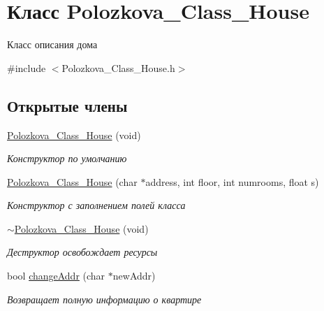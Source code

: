 \hypertarget{class_polozkova___class___house}{\section{Класс Polozkova\+\_\+\+Class\+\_\+\+House}
\label{class_polozkova___class___house}
}


Класс описания дома  




{\ttfamily \#include $<$Polozkova\+\_\+\+Class\+\_\+\+House.\+h$>$}

\subsection*{Открытые члены}
\begin{DoxyCompactItemize}
\item 
\hyperlink{class_polozkova___class___house_a50fe5562cd6f2821eec25293f736ab40}{Polozkova\+\_\+\+Class\+\_\+\+House} (void)
\begin{DoxyCompactList}\small\item\em Конструктор по умолчанию \end{DoxyCompactList}\item 
\hyperlink{class_polozkova___class___house_a4f6a3858b00cf5d5a73ccf0a31502801}{Polozkova\+\_\+\+Class\+\_\+\+House} (char $\ast$address, int floor, int numrooms, float s)
\begin{DoxyCompactList}\small\item\em Конструктор с заполнением полей класса \end{DoxyCompactList}\item 
\hypertarget{class_polozkova___class___house_a0b666f6bc92a01b41488dfaf5d4b8e68}{\hyperlink{class_polozkova___class___house_a0b666f6bc92a01b41488dfaf5d4b8e68}{$\sim$\+Polozkova\+\_\+\+Class\+\_\+\+House} (void)}\label{class_polozkova___class___house_a0b666f6bc92a01b41488dfaf5d4b8e68}

\begin{DoxyCompactList}\small\item\em Деструктор освобождает ресурсы \end{DoxyCompactList}\item 
bool \hyperlink{class_polozkova___class___house_adeb4aa7e77fe22495ebe3a0a4ea16735}{change\+Addr} (char $\ast$new\+Addr)
\begin{DoxyCompactList}\small\item\em Возвращает полную информацию о квартире \end{DoxyCompactList}\end{DoxyCompactItemize}
